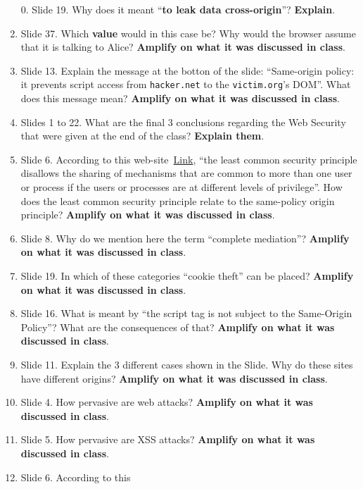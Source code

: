 \documentclass{article}
\begin{document}
\begin{enumerate}
\item[0.] Slide 19. Why does it meant ``\textbf{to leak data
    cross-origin}''? \textbf{Explain}. 

\item  Slide 37. Which \textbf{value} would in this case be? Why
  would the browser assume that it is talking to Alice?
  \textbf{Amplify on what it was discussed in class}.
%
\item Slide 13. Explain the message at the botton of the slide: ``Same-origin policy: it
  prevents script access from \texttt{hacker.net} to the \texttt{victim.org}’s
  DOM''. What does this message mean? 
  \textbf{Amplify on what it was discussed in class}.
\item Slides 1 to 22. What are the final 3 conclusions regarding the
  Web Security that were given at the end of the class?
  \textbf{Explain them}. 
\item Slide 6. According to this
  web-site~\href{https://owasp.org/www-project-developer-guide/draft/foundations/security_principles}{Link},
  ``the least common security principle disallows the sharing of
  mechanisms that are common to more than one user or process if the
  users or processes are at different levels of privilege''. How does
  the least common security principle relate to the same-policy origin
  principle? \textbf{Amplify on what it was discussed in class}.
\item Slide 8. Why do we mention here the term ``complete mediation''? \textbf{Amplify on what it
  was discussed in class}. 
\item Slide 19. In which of these categories ``cookie theft'' can be placed? \textbf{Amplify on
  what it was discussed in class}. 
\item Slide 16. What is meant by ``the script  tag is not subject to the Same-Origin
  Policy''? What are the consequences of that? 
  \textbf{Amplify on what it was discussed in class}.
\item Slide 11. Explain the 3 different cases shown in the Slide. Why do these sites
  have different origins?  \textbf{Amplify on what it was discussed in class}. 
\item Slide 4. How pervasive are web attacks? \textbf{Amplify on what it
  was discussed in class}. 
\item Slide 5. How pervasive are XSS attacks? \textbf{Amplify on what it
  was discussed in class}.  
% 
\item Slide 6. According to this

\end{enumerate}
\end{document}
